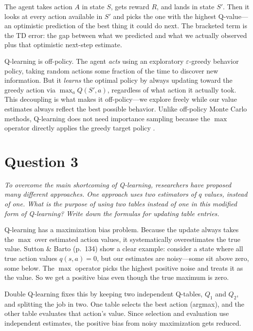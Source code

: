 \documentclass[letterpaper]{article}
\begin{document}
The agent takes action $A$ in state $S$, gets reward $R$, and lands in state $S'$. Then it looks at every action available in $S'$ and picks the one with the highest Q-value---an optimistic prediction of the best thing it could do next. The bracketed term is the TD error: the gap between what we predicted and what we actually observed plus that optimistic next-step estimate.

Q-learning is off-policy. The agent \textit{acts} using an exploratory $\varepsilon$-greedy behavior policy, taking random actions some fraction of the time to discover new information. But it \textit{learns} the optimal policy by always updating toward the greedy action via $\max_a Q(S',a)$, regardless of what action it actually took. This decoupling is what makes it off-policy---we explore freely while our value estimates always reflect the best possible behavior. Unlike off-policy Monte Carlo methods, Q-learning does not need importance sampling because the $\max$ operator directly applies the greedy target policy \citep{sutton2018reinforcement}.

\section*{Question 3}
\textit{To overcome the main shortcoming of Q-learning, researchers have proposed many different approaches. One approach uses two estimators of $q$ values, instead of one. What is the purpose of using two tables instead of one in this modified form of Q-learning? Write down the formulas for updating table entries.}

\vspace{0.5em}

Q-learning has a maximization bias problem. Because the update always takes the $\max$ over estimated action values, it systematically overestimates the true value. Sutton \& Barto (p.~134) show a clear example: consider a state where all true action values $q(s,a) = 0$, but our estimates are noisy---some sit above zero, some below. The $\max$ operator picks the highest positive noise and treats it as the value. So we get a positive bias even though the true maximum is zero.

Double Q-learning fixes this by keeping two independent Q-tables, $Q_1$ and $Q_2$, and splitting the job in two. One table selects the best action (argmax), and the other table evaluates that action's value. Since selection and evaluation use independent estimates, the positive bias from noisy maximization gets reduced.
\end{document}
